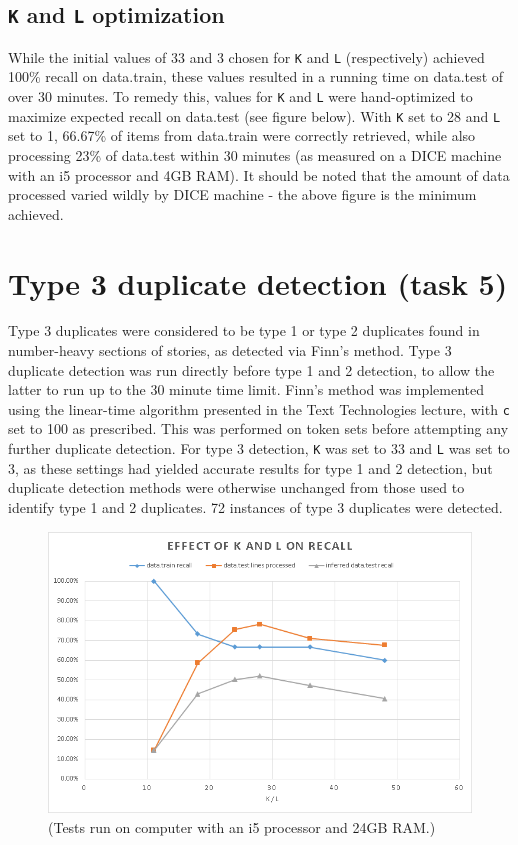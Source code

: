 \documentclass{article}
\begin{document}
\subsection{\texttt{K} and \texttt{L} optimization}
While the initial values of 33 and 3 chosen for \texttt{K} and \texttt{L} (respectively) achieved 100\% recall on data.train, these values resulted in a running time on data.test of over 30 minutes. To remedy this, values for \texttt{K} and \texttt{L} were hand-optimized to maximize expected recall on data.test (see figure below). With \texttt{K} set to 28 and \texttt{L} set to 1, 66.67\% of items from data.train were correctly retrieved, while also processing 23\% of data.test within 30 minutes (as measured on a DICE machine with an i5 processor and 4GB RAM). It should be noted that the amount of data processed varied wildly by DICE machine - the above figure is the minimum achieved.

\section{Type 3 duplicate detection (task 5)}
Type 3 duplicates were considered to be type 1 or type 2 duplicates found in number-heavy sections of stories, as detected via Finn's method. Type 3 duplicate detection was run directly before type 1 and 2 detection, to allow the latter to run up to the 30 minute time limit. Finn's method was implemented using the linear-time algorithm presented in the Text Technologies lecture, with \texttt{c} set to 100 as prescribed. This was performed on token sets before attempting any further duplicate detection. For type 3 detection, \texttt{K} was set to 33 and \texttt{L} was set to 3, as these settings had yielded accurate results for type 1 and 2 detection, but duplicate detection methods were otherwise unchanged from those used to identify type 1 and 2 duplicates. 72 instances of type 3 duplicates were detected.

\begin{figure}[ht!]
\centering
\includegraphics[width=165mm]{graph.png}
(Tests run on computer with an i5 processor and 24GB RAM.)
\end{figure}
\end{document}
